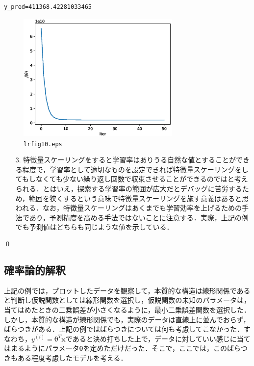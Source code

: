 \begin{ans}
\begin{cod}[\texttt{lr13.py}]
\begin{lstlisting}
y_pred=411368.42281033465
\end{lstlisting}
\begin{figure}[H]
\begin{center}
\framed
\includegraphics[width=8cm]{code/lrfig10.eps}
\vspace{-10pt}
\caption{\texttt{lrfig10.eps}}
\endframed
\end{center}
\end{figure}
\end{cod}
\begin{enumerate}
\item[3.] 特徴量スケーリングをすると学習率はありうる自然な値とすることができる程度で，学習率として適切なものを設定できれば特徴量スケーリングをしてもしなくても少ない繰り返し回数で収束させることができるのではと考えられる．とはいえ，探索する学習率の範囲が広大だとデバッグに苦労するため，範囲を狭くするという意味で特徴量スケーリングを施す意義はあると思われる．なお，特徴量スケーリングはあくまでも学習効率を上げるための手法であり，予測精度を高める手法ではないことに注意する．実際，上記の例でも予測値はどちらも同じような値を示している．
\end{enumerate}
\qed
\end{ans}

\subsection{確率論的解釈}

上記の例では，プロットしたデータを観察して，本質的な構造は線形関係であると判断し仮説関数としては線形関数を選択し，仮説関数の未知のパラメータは，当てはめたときの二乗誤差が小さくなるように，最小二乗誤差関数を選択した．しかし，本質的な構造が線形関係でも，実際のデータは直線上に並んでおらず，ばらつきがある．上記の例ではばらつきについては何も考慮してこなかった．すなわち，$y^{(i)}={\bm \theta}^T{\bm x}$であると決め打ちした上で，データに対していい感じに当てはまるようにパラメータ${\bm \theta}$を定めただけだった．そこで，ここでは，このばらつきもある程度考慮したモデルを考える．

